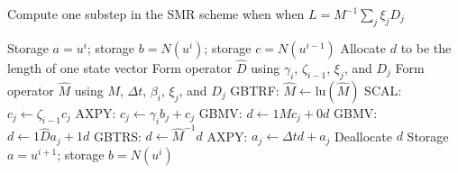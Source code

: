\documentclass[letterpaper,reqno,11pt]{amsart}
\begin{document}
\begin{algorithm}
\label{alg:substep}
\caption{Compute one substep in the SMR scheme when
         when $L=M^{-1} \sum_{j} \xi_j D_{j}$}
\begin{algorithmic}
  \REQUIRE Storage $a = u^i$;
           storage $b = N\left(u^{i}\right)$;
           storage $c = N\left(u^{i-1}\right)$
  \STATE Allocate $d$ to be the length of one state vector
  \STATE Form operator $\hat{D}$ using $\gamma_i$, $\zeta_{i-1}$,
         $\xi_j$, and $D_j$
  \STATE Form operator $\hat{M}$ using $M$, $\Delta{}t$, $\beta_i$,
         $\xi_j$, and $D_j$
  \STATE GBTRF:  $\hat{M}\leftarrow{}\mbox{lu}\left( \hat{M} \right)$
    \STATE SCAL: $c_{j}\leftarrow{}\zeta_{i-1}c_{j}$
    \STATE AXPY: $c_{j}\leftarrow{}\gamma_{i}b_{j}+c_{j}$
    \STATE GBMV: $d\leftarrow{}1 M c_{j} + 0 d$
    \STATE GBMV: $d\leftarrow{}1 \hat{D} a_{j} + 1 d$
    \STATE GBTRS: $d\leftarrow{}\hat{M}^{-1} d$
    \STATE AXPY: $a_{j}\leftarrow{}\Delta{}t d + a_{j}$
  \ENDFOR
  \STATE Deallocate $d$
  \ENSURE Storage $a = u^{i+1}$;
          storage $b = N\left(u^{i}\right)$
\end{algorithmic}
\end{algorithm}
\end{document}

